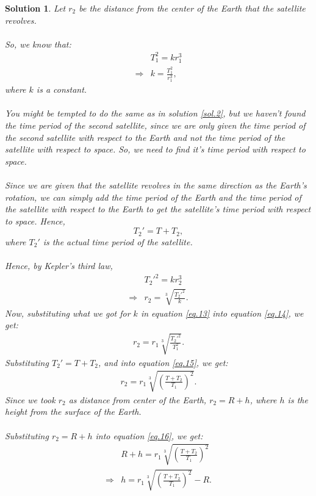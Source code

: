 \documentclass[a4paper]{report}
\newtheorem{solution}{Solution}
\begin{document}
  \begin{solution} \normalfont
    Let $r_2$ be the distance from the center of the Earth that the satellite revolves.\\\\
    So, we know that:
    \begin{equation} \label{eq.13}
      \begin{split}
        &T_1^2=kr_1^3\\
        \Rightarrow & k=\frac{T_1^2}{r_1^3},
      \end{split}
    \end{equation}
    where $k$ is a constant.\\\\
    You might be tempted to do the same as in solution \ref{sol.2}, but we haven't found the time period of the
    second satellite, since we are only given the time period of the second satellite with respect to the Earth and
    not the time period of the satellite with respect to space. So, we need to find it's time period with respect to
    space.\\\\
    Since we are given that the satellite revolves in the same direction as the Earth's rotation, we can simply 
    add the time period of the Earth and the time period of the satellite with respect to the Earth to get the 
    satellite's time period with respect to space. Hence, $$T_2'=T+T_2,$$ where $T_2'$ is the actual time period
    of the satellite.\\\\
    Hence, by Kepler's third law, 
    \begin{equation} \label{eq.14}
      \begin{split}
        &T_2'^2=kr_2^3\\
        \Rightarrow & r_2=\sqrt[3]{\frac{T_2'^2}{k}}.
      \end{split}
    \end{equation}
    Now, substituting what we got for $k$ in equation \ref{eq.13} into equation \ref{eq.14}, we get:
    \begin{align} \label{eq.15}
      r_2=r_1\sqrt[3]{\frac{T_2'^2}{T_1^2}}.
    \end{align}
    Substituting $T_2'=T+T_2$, and into equation \ref{eq.15}, we get:
    \begin{align} \label{eq.16}
      r_2=r_1\sqrt[3]{\left(\frac{T+T_2}{T_1}\right)^2}.
    \end{align}
    Since we took $r_2$ as distance from center of the Earth, $r_2=R+h$, where $h$ is the height from the surface
    of the Earth.\\\\
    Substituting $r_2=R+h$ into equation \ref{eq.16}, we get:
    \begin{align*}
      & R+h=r_1\sqrt[3]{\left(\frac{T+T_2}{T_1}\right)^2}\\
      \Rightarrow & h=\boxed{r_1\sqrt[3]{\left(\frac{T+T_2}{T_1}\right)^2}-R}.
    \end{align*}
  \end{solution}
\end{document}
